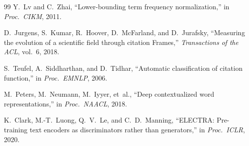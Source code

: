 \documentclass[10pt,twocolumn,twoside]{article}
\begin{document}
\begin{thebibliography}{99}
 Y.~Lv and C.~Zhai, ``Lower-bounding term frequency
normalization,'' in \emph{Proc.\ CIKM}, 2011.

 D.~Jurgens, S.~Kumar, R.~Hoover, D.~McFarland, and
D.~Jurafsky, ``Measuring the evolution of a scientific field through
citation Frames,'' \emph{Transactions of the ACL}, vol.~6, 2018.

 S.~Teufel, A.~Siddharthan, and D.~Tidhar, ``Automatic
classification of citation function,'' in \emph{Proc.\ EMNLP}, 2006.

 M.~Peters, M.~Neumann, M.~Iyyer, et~al., ``Deep
contextualized word representations,'' in \emph{Proc.\ NAACL}, 2018.

 K.~Clark, M.-T.~Luong, Q.~V.~Le, and C.~D.~Manning,
``ELECTRA: Pre-training text encoders as discriminators rather than
generators,'' in \emph{Proc.\ ICLR}, 2020.

\end{thebibliography}
\end{document}
